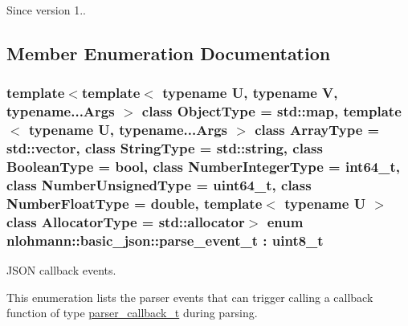 \begin{DoxySince}{Since}
version 1.. 
\end{DoxySince}


\subsection{Member Enumeration Documentation}
\subsubsection[{\texorpdfstring{parse\+\_\+event\+\_\+t}{parse\_event\_t}}]{\setlength{\rightskip}{0pt plus 5cm}template$<$template$<$ typename U, typename V, typename...\+Args $>$ class Object\+Type = std\+::map, template$<$ typename U, typename...\+Args $>$ class Array\+Type = std\+::vector, class String\+Type  = std\+::string, class Boolean\+Type  = bool, class Number\+Integer\+Type  = int64\+\_\+t, class Number\+Unsigned\+Type  = uint64\+\_\+t, class Number\+Float\+Type  = double, template$<$ typename U $>$ class Allocator\+Type = std\+::allocator$>$ enum {\bf nlohmann\+::basic\+\_\+json\+::parse\+\_\+event\+\_\+t} \+: uint8\+\_\+t\hspace{0.3cm}{\ttfamily [strong]}}\hypertarget{a00025_aea1c863b719b4ca5b77188c171bbfafe}{}\label{a00025_aea1c863b719b4ca5b77188c171bbfafe}


J\+S\+ON callback events. 

This enumeration lists the parser events that can trigger calling a callback function of type \hyperlink{a00025_a9e35475e2027520a78e09f460dbe048a}{parser\+\_\+callback\+\_\+t} during parsing.

